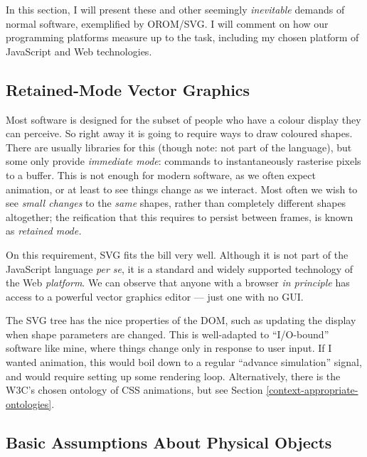 In this section, I will present these and other seemingly
\emph{inevitable} demands of normal software, exemplified by OROM/SVG. I
will comment on how our programming platforms measure up to the task,
including my chosen platform of JavaScript and Web technologies.

\hypertarget{retained-mode-vector-graphics}{%
\subsection{Retained-Mode Vector
Graphics}\label{retained-mode-vector-graphics}}

Most software is designed for the subset of people who have a colour
display they can perceive. So right away it is going to require ways to
draw coloured shapes. There are usually libraries for this (though note:
not part of the language), but some only provide \emph{immediate mode}:
commands to instantaneously rasterise pixels to a buffer. This is not
enough for modern software, as we often expect animation, or at least to
see things change as we interact. Most often we wish to see \emph{small
changes} to the \emph{same} shapes, rather than completely different
shapes altogether; the reification that this requires to persist between
frames, is known as \emph{retained mode.}

On this requirement, SVG fits the bill very well. Although it is not
part of the JavaScript language \emph{per se}, it is a standard and
widely supported technology of the Web \emph{platform}. We can observe
that anyone with a browser \emph{in principle} has access to a powerful
vector graphics editor --- just one with no GUI.

The SVG tree has the nice properties of the DOM, such as updating the
display when shape parameters are changed. This is well-adapted to
``I/O-bound'' software like mine, where things change only in response
to user input. If I wanted animation, this would boil down to a regular
``advance simulation'' signal, and would require setting up some
rendering loop. Alternatively, there is the W3C's chosen ontology of CSS
animations, but see Section \ref{context-appropriate-ontologies}.

\hypertarget{basic-assumptions-about-physical-objects}{%
\subsection{Basic Assumptions About Physical
Objects}\label{basic-assumptions-about-physical-objects}}

